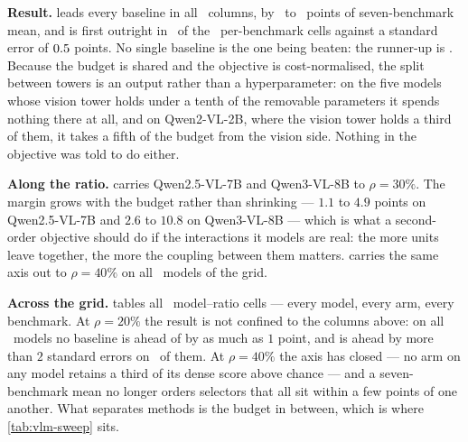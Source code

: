 \begin{table}[t]
\centering\small
\caption{Vision--language models, mean accuracy over seven benchmarks at $1000$ items each. Every
selector is training-free and runs under one shared budget and one shared guard. Retention is
floor-corrected against the dense model measured here.}
\label{tab:vlm}
\setlength{\tabcolsep}{2pt}

\end{table}

\textbf{Result.} \method leads every baseline in all \vlmNcolsW\ columns, by \vlmMarginLo\ to
\vlmMarginHi\ points of seven-benchmark mean, and is first outright in \vlmNfirst\ of the
\vlmNcells\ per-benchmark cells against a standard error of $0.5$ points. No single baseline is the
one being beaten: the runner-up is \vlmRunnerUps. Because the budget is shared and the objective is
cost-normalised, the split between towers is an output rather than a hyperparameter: on the five
models whose vision tower holds under a tenth of the removable parameters it spends nothing there at
all, and on Qwen2-VL-2B, where the vision tower holds a third of them, it takes a fifth of the budget
from the vision side. Nothing in the objective was told to do either.

\textbf{Along the ratio.}  carries Qwen2.5-VL-7B and Qwen3-VL-8B to $\rho{=}30\%$. The margin grows with the budget rather than shrinking --- $1.1$ to $4.9$ points on
Qwen2.5-VL-7B and $2.6$ to $10.8$ on Qwen3-VL-8B --- which is what a second-order objective should do
if the interactions it models are real: the more units leave together, the more the coupling between
them matters.  carries the same axis out to $\rho{=}40\%$ on all
\vlmModelsAtHighW\ models of the grid.

\textbf{Across the grid.}  tables all \vlmAllCells\ model--ratio cells --- every
model, every arm, every benchmark. At $\rho{=}20\%$ the result is not confined to the columns above:
on all \vlmGridModelsW\ models no baseline is ahead of \method by as much as $1$ point, and \method
is ahead by more than $2$ standard errors on \vlmNcolsW\ of them. At $\rho{=}40\%$ the axis has
closed --- no arm on any model retains a third of its dense score above chance --- and a
seven-benchmark mean no longer orders selectors that all sit within a few points of one another. What
separates methods is the budget in between, which is where \cref{tab:vlm-sweep} sits.

